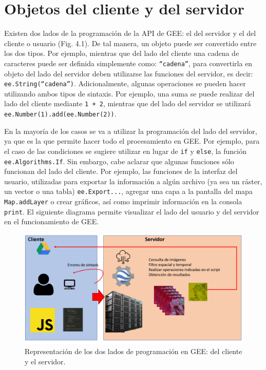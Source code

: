 \documentclass[
  12pt,
  letterpaper,
  twoside]{book}
\begin{document}
\hypertarget{objetos-del-cliente-y-del-servidor}{%
\section{Objetos del cliente y del servidor}\label{objetos-del-cliente-y-del-servidor}}

Existen dos lados de la programación de la API de GEE: el del servidor y el del cliente o usuario (Fig. 4.1). De tal manera, un objeto puede ser convertido entre los dos tipos. Por ejemplo, mientras que del lado del cliente una cadena de caracteres puede ser definida simplemente como: \texttt{“cadena”}, para convertirla en objeto del lado del servidor deben utilizarse las funciones del servidor, es decir: \texttt{ee.String(“cadena”)}. Adicionalmente, algunas operaciones se pueden hacer utilizando ambos tipos de sintaxis. Por ejemplo, una suma se puede realizar del lado del cliente mediante \texttt{1\ +\ 2}, mientras que del lado del servidor se utilizará \texttt{ee.Number(1).add(ee.Number(2))}.

En la mayoría de los casos se va a utilizar la programación del lado del servidor, ya que es la que permite hacer todo el procesamiento en GEE. Por ejemplo, para el caso de las condiciones se sugiere utilizar en lugar de \texttt{if} y \texttt{else}, la función \texttt{ee.Algorithms.If}. Sin embargo, cabe aclarar que algunas funciones sólo funcionan del lado del cliente. Por ejemplo, las funciones de la interfaz del usuario, utilizadas para exportar la información a algún archivo (ya sea un ráster, un vector o una tabla) \texttt{ee.Export...}, agregar una capa a la pantalla del mapa \texttt{Map.addLayer} o crear gráficos, así como imprimir información en la consola \texttt{print}. El siguiente diagrama permite visualizar el lado del usuario y del servidor en el funcionamiento de GEE.

\begin{figure}[btp]

{\centering \includegraphics[width=1\linewidth]{Img/daigFunc} 

}

\caption{Representación de los dos lados de programación en GEE: del cliente y el servidor.}\label{fig:unnamed-chunk-36}
\end{figure}
\end{document}
